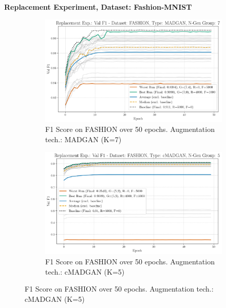 \newpage
\noindent\textbf{Replacement Experiment, Dataset: Fashion-MNIST}
\begin{figure}[H]
	\centering
	\begin{subfigure}{.85\textwidth}
		\includegraphics[width=\textwidth]{abb/strat_classifier_performance/FASHION_STRATIFIED_CLASSIFIERS_MADGAN_NEW/replacement_experiments/val_f1_score_MADGAN_FASHION_n_gen_7_all.png}
		\caption{F1 Score on FASHION over 50 epochs. Augmentation tech.: MADGAN (K=7)}
        \label{fig:res_replacement_fashion_cmadgan_vs_madgan__madgan}
	\end{subfigure}
	\begin{subfigure}{.85\textwidth}
		\includegraphics[width=\textwidth]{abb/strat_classifier_performance/FASHION_STRATIFIED_CLASSIFIERS_cMADGAN_NEW/replacement_experiments/val_f1_score_cMADGAN_FASHION_n_gen_5_all.png}
		\caption{F1 Score on FASHION over 50 epochs. Augmentation tech.: cMADGAN (K=5)}
        \label{fig:res_replacement_fashion_cmadgan_vs_madgan__cmadgan}
	\end{subfigure}
\end{figure}

